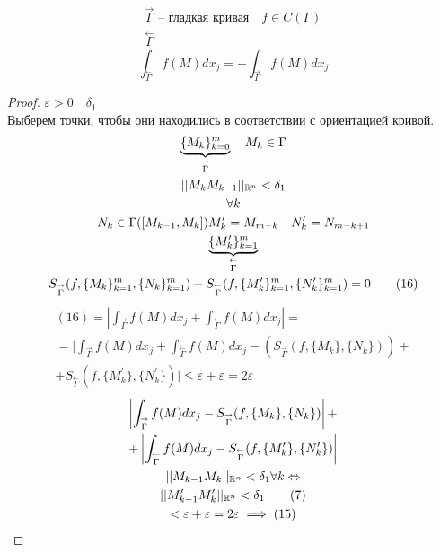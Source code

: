 \documentclass[main]{subfiles}
\begin{document}
\begin{theorem}
    \begin{gather*}
        \stackrel{\rightarrow}{\Gamma} \text{ -- гладкая кривая} \quad f \in C(\Gamma) \\
        \stackrel{\leftarrow}{\Gamma} 
    \end{gather*}
    \[ \int_{\stackrel{\leftarrow}{\Gamma}} f(M)dx_j = - \int_{\stackrel{\rightarrow}{\Gamma}} f(M)dx_j \tag{15} \] 
\end{theorem}
\begin{proof}
    $\varepsilon > 0 \quad \delta_1$\\
    Выберем точки, чтобы они находились в соответствии с ориентацией кривой.
    \begin{gather*}
        \underbrace{\{ M_k \}^m_{k=0}}_{\stackrel{\rightarrow}{\Gamma}} \quad M_k \in \Gamma \\
        ||M_kM_{k-1}||_{{\mathbb{R}^n}} < \delta_1 \\
        \forall k \\
        N_k \in \Gamma([M_{k-1},M_k])
        M^\prime_k = M_{m-k} \quad N^\prime_k = N_{m-k+1}\\
        \underbrace{\{ M^\prime_k \}^m_{k=1}}_{\stackrel{\leftarrow}{\Gamma}}\\
        S_{\stackrel{\rightarrow}{\Gamma}}(f, \{M_k\}^m_{k=1}, \{N_k\}^m_{k=1}) + 
        S_{\stackrel{\leftarrow}{\Gamma}}(f, \{M^\prime_k\}^m_{k=1}, \{N^\prime_k\}^m_{k=1}) = 0 \tag{16}
    \end{gather*}
    \begin{multline*}
        (16) = \left| \int_{\stackrel{\rightarrow}{\Gamma}}f(M)dx_j + \int_{\stackrel{\leftarrow}{\Gamma}} f(M)dx_j \right| = \\
        =  \bigg| \int_{\stackrel{\rightarrow}{\Gamma}} f(M)dx_j + \int_{\stackrel{\leftarrow}{\Gamma}} f(M)dx_j  -
        (S_{\stackrel{\rightarrow}{\Gamma}}(f, \{M_k\}, \{N_k\})) + \\ 
        + S_{\stackrel{\leftarrow}{\Gamma}}(f, \{M^\prime_k\}, \{N^\prime_k\}) \bigg| 
        \leq \varepsilon + \varepsilon = 2 \varepsilon
    \end{multline*}
    \begin{gather*}
        \left| \int_{\stackrel{\rightarrow}{\Gamma}}f(M)dx_j - S_{\stackrel{\rightarrow}{\Gamma}}(f, \{M_k\},\{N_k\}) \right| + \\
        + \left| \int_{\stackrel{\leftarrow}{\Gamma}} f(M)dx_j-S_{\stackrel{\leftarrow}{\Gamma}}(f, \{ M^\prime_k\},\{ N^\prime_k\} ) \right| \\
        || M_{k-1}M_k||_{{\mathbb{R}^n}} < \delta_1 \forall k \Leftrightarrow \\
        ||M^\prime_{k-1}M^\prime_{k}||_{{\mathbb{R}^n}} < \delta_1 \tag{7}\\
        < \varepsilon + \varepsilon = 2\varepsilon \implies(15)
    \end{gather*}
\end{proof}
\end{document}
